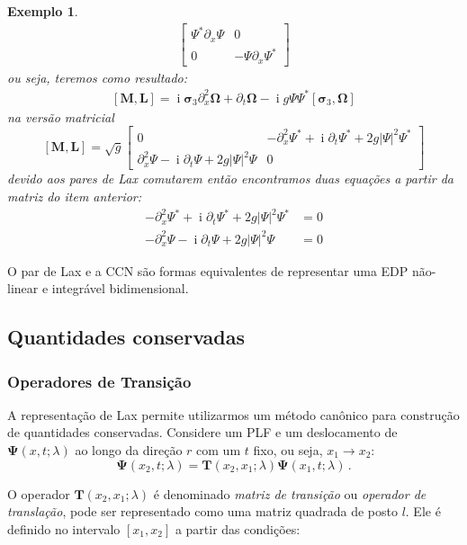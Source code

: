\documentclass[25pt]{article}
\numberwithin{equation}{subsection} %
\DeclareMathOperator{\I}{i}
\newtheorem{expl}{Exemplo}
\newcommand{\commutador}[2]{\left[#1,#2\right]}
\newcommand{\OP}[1]{\mathbf{#1}}
\begin{document}
\begin{expl}
\begin{align*}
\begin{bmatrix}
\Psi^*\partial_x\Psi&0\\
0&-\Psi\partial_x\Psi^*
\end{bmatrix}
\end{align*}
ou seja, teremos como resultado:
\begin{align*}
\commutador{\OP{M}}{\OP{L}}=\I\bm{\sigma}_3\partial_x^2\bm{\Omega}+\partial_t\bm{\Omega}-\I g\Psi\Psi^*\commutador{\bm{\sigma}_3}{\bm{\Omega}}
\end{align*}
na versão matricial
\begin{equation}
\commutador{\OP{M}}{\OP{L}}=\sqrt{g}\begin{bmatrix}
0&-\partial_x^2\Psi^*+\I\partial_t\Psi^*+2g\left|\Psi\right|^2\Psi^*\\
\partial_x^2\Psi-\I\partial_t\Psi+2g\left|\Psi\right|^2\Psi&0
\end{bmatrix}
\end{equation}
devido aos pares de Lax comutarem então encontramos duas equações a partir da matriz do item anterior:
\begin{align*}
-\partial_x^2\Psi^*+\I \partial_t\Psi^*+2g\left|\Psi\right|^2\Psi^*&=0\\
-\partial_x^2\Psi-\I\partial_t\Psi+2g\left|\Psi\right|^2\Psi&=0
\end{align*}
\end{expl}

O par de Lax e a CCN são formas equivalentes de representar uma EDP não-linear e integrável bidimensional.

\subsection{Quantidades conservadas}

\subsubsection{Operadores de Transição}

A representação de Lax permite utilizarmos um método canônico para construção de quantidades conservadas. Considere um PLF e um deslocamento de $\bm{\Psi}(x,t;\lambda)$ ao longo da direção $r$ com um $t$ fixo, ou seja, $x_1\to x_2$:
\begin{equation}
\bm{\Psi}(x_2,t;\lambda)=\OP{T}\left(x_2,x_1;\lambda\right)\bm{\Psi}\left(x_1,t;\lambda\right)\,.
\end{equation}

O operador $\OP{T}(x_2,x_1;\lambda)$ é denominado \textit{matriz de transição} ou \textit{operador de translação}, pode ser representado como uma matriz quadrada de posto $l$. Ele é definido no intervalo $\left[x_1,x_2\right]$ a partir das condições:
\end{document}
